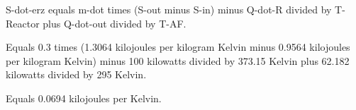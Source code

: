 S-dot-erz equals m-dot times (S-out minus S-in) minus Q-dot-R divided by T-Reactor plus Q-dot-out divided by T-AF.  

Equals 0.3 times (1.3064 kilojoules per kilogram Kelvin minus 0.9564 kilojoules per kilogram Kelvin) minus 100 kilowatts divided by 373.15 Kelvin plus 62.182 kilowatts divided by 295 Kelvin.  

Equals 0.0694 kilojoules per Kelvin.